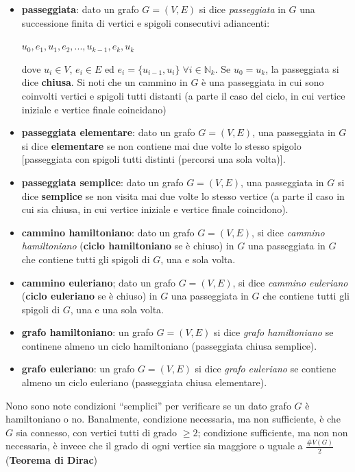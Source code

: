 \begin{flushleft}
    \begin{itemize}[nosep]
        \item \textbf{passeggiata}: dato un grafo $G = (V, E)$ si dice \textit{passeggiata} in $G$ una successione finita di vertici e spigoli consecutivi adiancenti:

        {\centering
            $u_0, e_1, u_1, e_2, ..., u_{k-1}, e_k, u_k$
        \par}
        dove $u_i \in V$, $e_i \in E$ ed $e_i = \{u_{i-1}, u_i\} \; \forall i \in \mathbb{N}_k$. Se $u_0 = u_k$, la passeggiata si dice \textbf{chiusa}. Si noti che un cammino in $G$ è una passeggiata in cui sono coinvolti vertici e spigoli tutti distanti (a parte il caso del ciclo, in cui vertice iniziale e vertice finale coincidano)
        \item \textbf{passeggiata elementare}: dato un grafo $G = (V, E)$, una passeggiata in $G$ si dice \textbf{elementare} se non contiene mai due volte lo stesso spigolo [passeggiata con spigoli tutti distinti (percorsi una sola volta)].
        \item \textbf{passeggiata semplice}: dato un grafo $G = (V, E)$, una passeggiata in $G$ si dice \textbf{semplice} se non visita mai due volte lo stesso vertice (a parte il caso in cui sia chiusa, in cui vertice iniziale e vertice finale coincidono).
        \item \textbf{cammino hamiltoniano}: dato un grafo $G = (V, E)$, si dice \textit{cammino hamiltoniano} (\textbf{ciclo hamiltoniano} se è chiuso) in $G$ una passeggiata in $G$ che contiene tutti gli spigoli di $G$, una e sola volta.
        \item \textbf{cammino euleriano}; dato un grafo $G = (V, E)$, si dice \textit{cammino euleriano} (\textbf{ciclo euleriano} se è chiuso) in $G$ una passeggiata in $G$ che contiene tutti gli spigoli di $G$, una e una sola volta.
        \item \textbf{grafo hamiltoniano}: un grafo $G = (V, E)$ si dice \textit{grafo hamiltoniano} se continene almeno un ciclo hamiltoniano (passeggiata chiusa semplice).
        \item \textbf{grafo euleriano}: un grafo $G = (V, E)$ si dice \textit{grafo euleriano} se contiene almeno un ciclo euleriano (passeggiata chiusa elementare).
    \end{itemize}
    Nono sono note condizioni ``semplici'' per verificare se un dato grafo $G$ è hamiltoniano o no. Banalmente, condizione necessaria, ma non sufficiente, è che $G$ sia connesso, con vertici tutti di grado $\geq 2$; condizione sufficiente, ma non non necessaria, è invece che il grado di ogni vertice sia maggiore o uguale a $\frac{\# V(G)}{2}$ (\textbf{Teorema di Dirac})


\end{flushleft}
